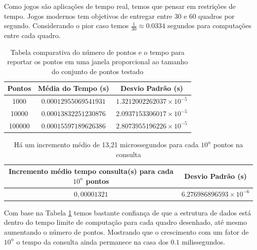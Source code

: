 Como jogos são aplicações de tempo real, temos que pensar em restrições de tempo. Jogos modernos tem objetivos de entregar entre 30 e 60 quadros por segundo. Considerando o pior caso temos $\frac{1}{30} \approx 0.0334$ segundos para computações entre cada quadro.

\begin{table}[h!]
\centering
\begin{tabular}{|c c c |} 

 \hline
 Pontos & Média do Tempo (s) & Desvio Padrão (s) \\%
 \hline
 1000  & $0.00012955069541931$  & $1.3212002262037\times 10^{-5}$ \\
\hline
 10000  & $0.00013832251230876$  & $2.0937153306017\times 10^{-5}$ \\
\hline
 100000  & $0.00015597189626386$  & $2.8073955196226\times 10^{-5}$ \\
\hline
\end{tabular}
\caption{Tabela comparativa do número de pontos e o tempo para reportar os pontos em uma janela proporcional ao tamanho do conjunto de pontos testado}
\label{table:1}
\end{table}

\begin{table}[h!]
\centering
\begin{tabular}{|c c |} 

 \hline
 Incremento médio tempo consulta(s) para cada $10^{n} $ pontos & Desvio Padrão (s) \\%
 \hline
 $0,00001321$  & $ 6.276986896593 \times 10^{-6}$ \\
\hline
\end{tabular}
\caption{Há um incremento médio de 13,21 microssegundos para cada $10^{n}$ pontos na consulta }
\label{table:2}
\end{table}

Com base na Tabela \ref{table:1} temos bastante confiança de que a estrutura de dados está dentro do tempo limite de computação para cada quadro desenhado, até mesmo aumentando o número de pontos. Mostrando que o crescimento com um fator de $10^n$ o tempo da consulta ainda permanece na casa dos $0.1$ milissegundos.

